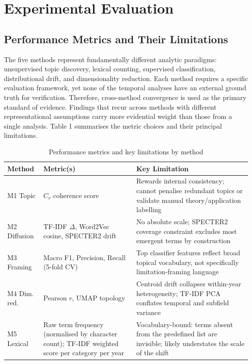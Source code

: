 \section{Experimental Evaluation}

\subsection{Performance Metrics and Their Limitations}

The five methods represent fundamentally different analytic paradigms: unsupervised topic discovery, lexical counting, supervised classification, distributional drift, and dimensionality reduction. Each method requires a specific evaluation framework, yet none of the temporal analyses have an external ground truth for verification. Therefore, cross-method convergence is used as the primary standard of evidence. Findings that recur across methods with different representational assumptions carry more evidential weight than those from a single analysis. Table 1 summarises the metric choices and their principal limitations.
\begin{table}[H]
\centering
\caption{Performance metrics and key limitations by method}
\small
\setlength{\tabcolsep}{4pt}

\begin{tabularx}{\linewidth}{l >{\raggedright\arraybackslash}p{2.2cm} X}
\toprule
\textbf{Method} & \textbf{Metric(s)} & \textbf{Key Limitation} \\
\midrule
M1 Topic        & $C_v$ coherence score 
                & Rewards internal consistency; cannot penalise redundant topics or validate manual theory/application labelling \\
M2 Diffusion    & TF-IDF $\Delta$, Word2Vec cosine, SPECTER2 drift 
                & No absolute scale; SPECTER2 coverage constraint excludes most emergent terms by construction \\
M3 Framing      & Macro F1, Precision, Recall (5-fold CV) 
                & Top classifier features reflect broad topical vocabulary, not specifically limitation-framing language \\
M4 Dim. red.    & Pearson $r$, UMAP topology 
                & Centroid drift collapses within-year heterogeneity; TF-IDF PCA conflates temporal and subfield variance \\
M5 Lexical      & Raw term frequency (normalised by character count); TF-IDF weighted score per category per year
                & Vocabulary-bound: terms absent from the predefined list are invisible; likely understates the scale of the shift \\
\bottomrule
\end{tabularx}

\end{table}

